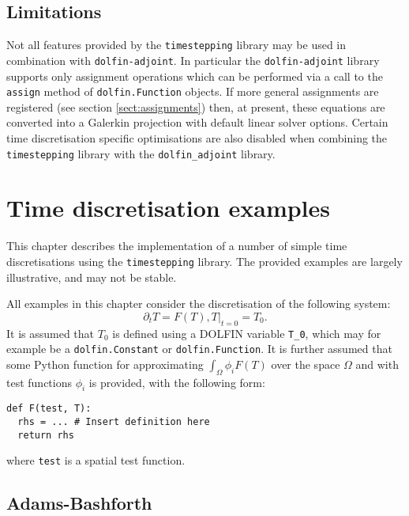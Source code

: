 \documentclass[a4paper]{book}
\begin{document}
\section{Limitations}

Not all features provided by the \verb+timestepping+ library may be used in
combination with \verb+dolfin-adjoint+. In particular the \verb+dolfin-adjoint+
library supports only assignment operations which can be performed via a call
to the \verb+assign+ method of \verb+dolfin.Function+ objects. If more general
assignments are registered (see section \ref{sect:assignments}) then, at
present, these equations are converted into a Galerkin projection with default
linear solver options. Certain time discretisation specific optimisations are
also disabled when combining the \verb+timestepping+ library with the
\verb+dolfin_adjoint+ library.

\chapter{Time discretisation examples}

This chapter describes the implementation of a number of simple time
discretisations using the \verb+timestepping+ library. The provided examples are
largely illustrative, and may not be stable.

All examples in this chapter consider
the discretisation of the following system:
\begin{subequations}
  \begin{equation}\label{eqn:t_timestep}
    \partial_t T = F(T),
  \end{equation}
  \begin{equation}\label{eqn:t_init}
    \left. T \right|_{t = 0} = T_0.
  \end{equation}
\end{subequations}
It is assumed that $T_0$ is defined using a DOLFIN variable \verb+T_0+, which
may for example be a \verb+dolfin.Constant+ or \verb+dolfin.Function+. It is
further assumed that some Python function for approximating
$\int_\Omega \phi_i F(T)$ over the space $\Omega$ and with test functions
$\phi_i$ is provided, with the following form:
\begin{lstlisting}
def F(test, T):
  rhs = ... # Insert definition here
  return rhs
\end{lstlisting}
where \verb+test+ is a spatial test function.

\section{Adams-Bashforth}
\end{document}
